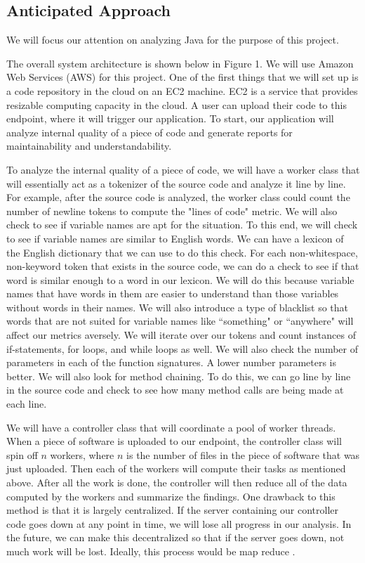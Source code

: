 \documentclass{sig-alternate}
\begin{document}
\subsection{Anticipated Approach}
\label{subsec:approach}
We will focus our attention on analyzing Java for the purpose of this project. 

The overall system architecture is shown below in Figure 1. We will use Amazon Web Services (AWS) for this project. One of the first things that we will set up is a code repository in the cloud on an EC2 machine. EC2 is a service that provides resizable computing capacity in the cloud. A user can upload their code to this endpoint, where it will trigger our application. To start, our application will analyze internal quality of a piece of code and generate reports for maintainability and understandability. 

To analyze the internal quality of a piece of code, we will have a worker class that will essentially act as a tokenizer of the source code and analyze it line by line. For example, after the source code is analyzed, the worker class could count the number of newline tokens to compute the "lines of code" metric. We will also check to see if variable names are apt for the situation. To this end, we will check to see if variable names are similar to English words. We can have a lexicon of the English dictionary that we can use to do this check. For each non-whitespace, non-keyword token that exists in the source code, we can do a check to see if that word is similar enough to a word in our lexicon. We will do this because variable names that have words in them are easier to understand than those variables without words in their names. We will also introduce a type of blacklist so that words that are not suited for variable names like ``something" or ``anywhere" will affect our metrics aversely. We will iterate over our tokens and count instances of if-statements, for loops, and while loops as well. We will also check the number of parameters in each of the function signatures. A lower number parameters is better.  We will also look for method chaining. To do this, we can go line by line in the source code and check to see how many method calls are being made at each line. 

We will have a controller class that will coordinate a pool of worker threads. When a piece of software is uploaded to our endpoint, the controller class will spin off $n$ workers, where $n$ is the number of files in the piece of software that was just uploaded. Then each of the workers will compute their tasks as mentioned above. After all the work is done, the controller will then reduce all of the data computed by the workers and summarize the findings. One drawback to this method is that it is largely centralized. If the server containing our controller code goes down at any point in time, we will lose all progress in our analysis. In the future, we can make this decentralized so that if the server goes down, not much work will be lost. Ideally, this process would be map reduce \cite{dean2008mapreduce}.
\end{document}
